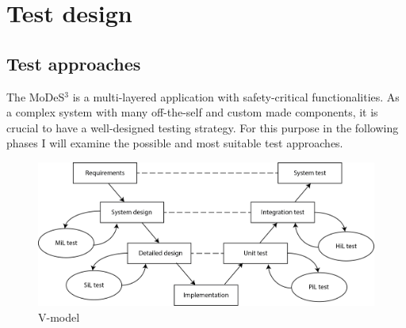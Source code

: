 \chapter{Test design}
\section{Test approaches}
The MoDeS$^3$ is a multi-layered application with safety-critical functionalities. As a complex system with many off-the-self and custom made components, it is crucial to have a well-designed testing strategy. For this purpose in the following phases I will examine the possible and most suitable test approaches.

\begin{figure}[h]
	\centering
	\includegraphics[width=150mm]{figures/testDesign/V_model.png}
	\caption{V-model}
	\label{fig:vModel}
\end{figure}

